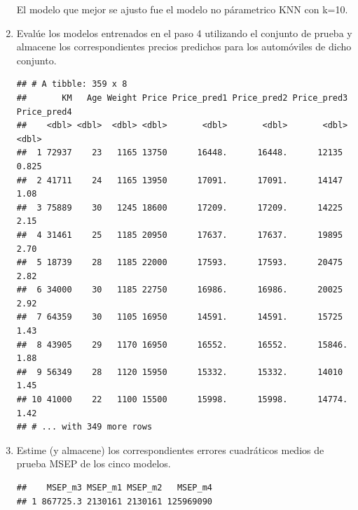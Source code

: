 \documentclass[11pt,letterpaper]{article}\usepackage[]{graphicx}\usepackage[]{color}
\makeatletter
\newenvironment{kframe}{%
 \def\at@end@of@kframe{}%
 \ifinner\ifhmode%
  \def\at@end@of@kframe{\end{minipage}}%
  \begin{minipage}{\columnwidth}%
 \fi\fi%
 \def\FrameCommand##1{\hskip\@totalleftmargin \hskip-\fboxsep
 \colorbox{shadecolor}{##1}\hskip-\fboxsep
     \hskip-\linewidth \hskip-\@totalleftmargin \hskip\columnwidth}%
 \MakeFramed {\advance\hsize-\width
   \@totalleftmargin\z@ \linewidth\hsize
   \@setminipage}}%
 {\par\unskip\endMakeFramed%
 \at@end@of@kframe}
\newenvironment{knitrout}{}{} %
\makeatother
\begin{document}
\begin{enumerate}
   El modelo que mejor se ajusto fue el modelo no párametrico KNN con k=10.\\
    \item Evalúe los modelos entrenados en el paso 4 utilizando el conjunto de prueba y almacene los correspondientes precios predichos para los automóviles de dicho conjunto.
\begin{knitrout}
\color{fgcolor}\begin{kframe}
\begin{verbatim}
## # A tibble: 359 x 8
##       KM   Age Weight Price Price_pred1 Price_pred2 Price_pred3 Price_pred4
##    <dbl> <dbl>  <dbl> <dbl>       <dbl>       <dbl>       <dbl>       <dbl>
##  1 72937    23   1165 13750      16448.      16448.      12135        0.825
##  2 41711    24   1165 13950      17091.      17091.      14147        1.08 
##  3 75889    30   1245 18600      17209.      17209.      14225        2.15 
##  4 31461    25   1185 20950      17637.      17637.      19895        2.70 
##  5 18739    28   1185 22000      17593.      17593.      20475        2.82 
##  6 34000    30   1185 22750      16986.      16986.      20025        2.92 
##  7 64359    30   1105 16950      14591.      14591.      15725        1.43 
##  8 43905    29   1170 16950      16552.      16552.      15846.       1.88 
##  9 56349    28   1120 15950      15332.      15332.      14010        1.45 
## 10 41000    22   1100 15500      15998.      15998.      14774.       1.42 
## # ... with 349 more rows
\end{verbatim}
\end{kframe}
\end{knitrout}
    \item Estime (y almacene) los correspondientes errores cuadráticos medios de prueba MSEP de los cinco modelos.
\begin{knitrout}
\color{fgcolor}\begin{kframe}
\begin{verbatim}
##    MSEP_m3 MSEP_m1 MSEP_m2   MSEP_m4
## 1 867725.3 2130161 2130161 125969090
\end{verbatim}
\end{kframe}
\end{knitrout}
    

\end{enumerate}
\end{document}
